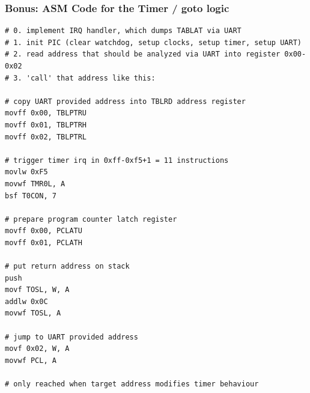 \documentclass[aspectratio=169]{beamer}
\begin{document}
\begin{frame}[fragile]
	\frametitle{Bonus: ASM Code for the Timer / goto logic}

\begin{tiny}
\begin{lstlisting}[frame=single]
# 0. implement IRQ handler, which dumps TABLAT via UART
# 1. init PIC (clear watchdog, setup clocks, setup timer, setup UART)
# 2. read address that should be analyzed via UART into register 0x00-0x02
# 3. 'call' that address like this:

# copy UART provided address into TBLRD address register
movff 0x00, TBLPTRU
movff 0x01, TBLPTRH
movff 0x02, TBLPTRL

# trigger timer irq in 0xff-0xf5+1 = 11 instructions
movlw 0xF5
movwf TMR0L, A
bsf T0CON, 7

# prepare program counter latch register
movff 0x00, PCLATU
movff 0x01, PCLATH

# put return address on stack
push
movf TOSL, W, A
addlw 0x0C
movwf TOSL, A

# jump to UART provided address
movf 0x02, W, A
movwf PCL, A

# only reached when target address modifies timer behaviour
\end{lstlisting}
\end{tiny}
\end{frame}
\end{document}
